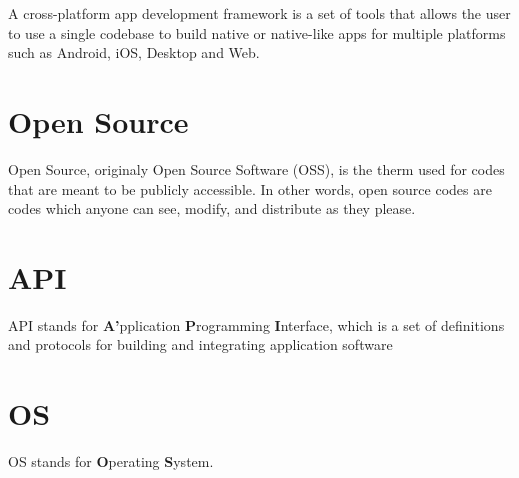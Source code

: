 
A cross-platform app development framework is a set of tools that allows the user to use a single codebase to build native or native-like apps for multiple platforms such as Android, iOS, Desktop and Web.

\section*{Open Source }
\label{sub:open_source}

Open Source, originaly Open Source Software (OSS), is the therm used for codes that are meant to be publicly accessible. In other words, open source codes are codes which anyone can see, modify, and distribute as they please. %


\section*{API}
\label{sub:api}

API stands for \textbf{A'}pplication \textbf{P}rogramming \textbf{I}nterface, which is a set of definitions and protocols for building and integrating application software


\section*{OS}
\label{os}

OS stands for \textbf{O}perating \textbf{S}ystem.
